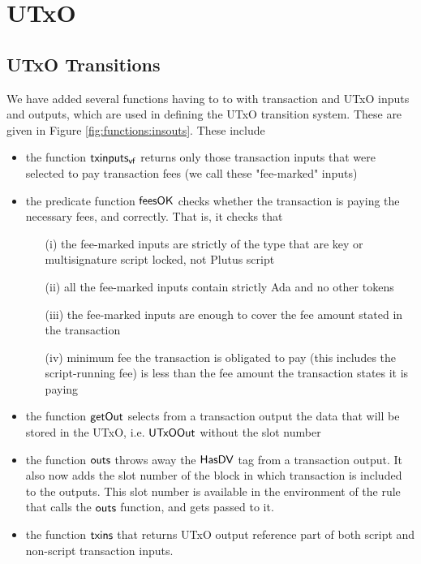 \section{UTxO}
\label{sec:utxo}


\subsection{UTxO Transitions}
\label{sec:utxo-trans}

We have added several functions having to to with transaction and UTxO inputs and
outputs, which are used in defining the UTxO transition system. These are
given in Figure \ref{fig:functions:insouts}. These include

\begin{itemize}
  \item the function $\mathsf{txinputs_{vf}}$ returns only those transaction inputs
  that were selected to pay transaction fees (we call these "fee-marked" inputs)
  \item the predicate function $\mathsf{feesOK}$ checks whether the transaction is
  paying the necessary fees, and correctly. That is, it checks that
  \begin{itemize}
    \item[(i)] the fee-marked inputs are strictly of the type that are key or
    multisignature script locked, not Plutus script
    \item [(ii)] all the fee-marked inputs contain strictly Ada and no other tokens
    \item [(iii)] the fee-marked inputs are enough to cover the fee amount stated
    in the transaction
    \item [(iv)] minimum fee the transaction is obligated to pay (this includes
    the script-running fee) is less than the fee amount the transaction states
    it is paying
  \end{itemize}
  \item the function $\mathsf{getOut}$ selects from a transaction output the data that
  will be stored in the UTxO, i.e. $\mathsf{UTxOOut}$ without the slot number
  \item the function $\mathsf{outs}$ throws away the $\mathsf{HasDV}$ tag from a
  transaction output. It also now adds the slot number of the block in which transaction is
  included to the outputs. This slot number is available in the
  environment of the rule that calls the $\mathsf{outs}$ function, and gets
  passed to it.
  \item the function $\mathsf{txins}$ that returns UTxO output reference part of both script
  and non-script transaction inputs.
\end{itemize}

